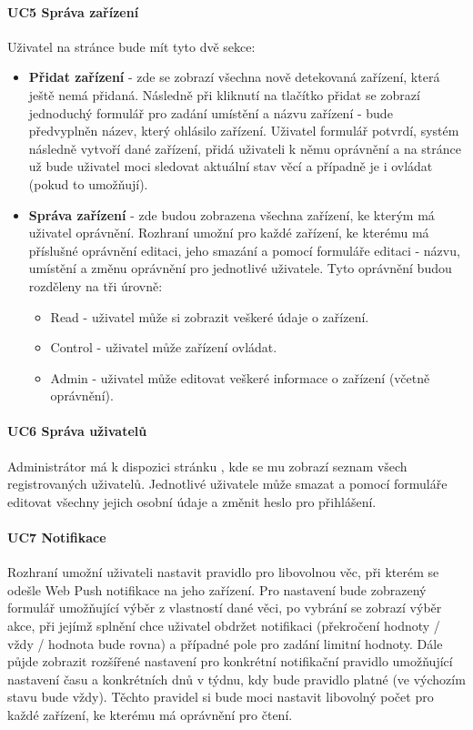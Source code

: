 \paragraph{UC5 Správa zařízení}
\label{UC5}
Uživatel na stránce  bude mít tyto dvě sekce:
\begin{itemize}
    \item \textbf{Přidat zařízení} - zde se zobrazí všechna nově detekovaná zařízení, která ještě nemá přidaná. Následně při kliknutí na tlačítko přidat se zobrazí jednoduchý formulář pro zadání umístění a názvu zařízení - bude předvyplněn název, který ohlásilo zařízení. Uživatel formulář potvrdí, systém následně vytvoří dané zařízení, přidá uživateli k němu oprávnění a na stránce  už bude uživatel moci sledovat aktuální stav věcí a případně je i ovládat (pokud to umožňují).
    \item  \textbf{Správa zařízení} - zde budou zobrazena všechna zařízení, ke kterým má uživatel oprávnění. Rozhraní umožní pro každé zařízení, ke kterému má příslušné oprávnění editaci, jeho smazání a pomocí formuláře editaci - názvu, umístění a změnu oprávnění pro jednotlivé uživatele. Tyto oprávnění budou rozděleny na tři úrovně:
          \begin{itemize}
              \item Read - uživatel může si zobrazit veškeré údaje o zařízení.
              \item Control - uživatel může zařízení ovládat.
              \item Admin - uživatel může editovat veškeré informace o zařízení (včetně oprávnění).
          \end{itemize}
\end{itemize}

\paragraph{UC6 Správa uživatelů}
Administrátor má k dispozici stránku , kde se mu zobrazí seznam všech registrovaných uživatelů. Jednotlivé uživatele může smazat a pomocí formuláře editovat všechny jejich osobní údaje a změnit heslo pro přihlášení.

\paragraph{UC7 Notifikace}
Rozhraní umožní uživateli nastavit pravidlo pro libovolnou věc, při kterém se odešle Web Push notifikace na jeho zařízení. Pro nastavení bude zobrazený formulář umožňující výběr z vlastností dané věci, po vybrání se zobrazí výběr akce, při jejímž splnění chce uživatel obdržet notifikaci (překročení hodnoty / vždy / hodnota bude rovna) a případné pole pro zadání limitní hodnoty. Dále půjde zobrazit rozšířené nastavení pro konkrétní notifikační pravidlo umožňující nastavení času a konkrétních dnů v týdnu, kdy bude pravidlo platné (ve výchozím stavu bude vždy). Těchto pravidel si bude moci nastavit libovolný počet pro každé zařízení, ke kterému má oprávnění pro čtení.



